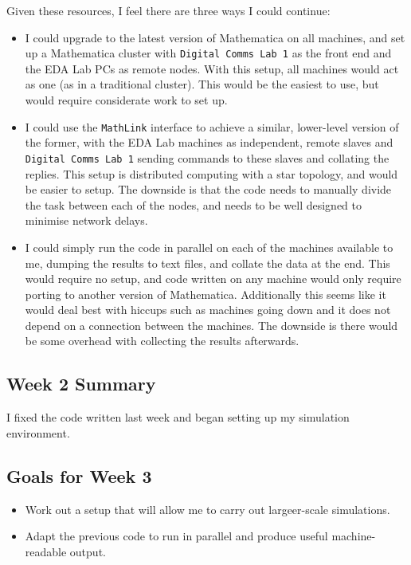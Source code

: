 Given these resources, I feel there are three ways I could continue:

\begin{itemize}
\itemsep1pt\parskip0pt
\item
  I could upgrade to the latest version of Mathematica on all machines,
  and set up a Mathematica cluster with \texttt{Digital Comms Lab 1} as
  the front end and the EDA Lab PCs as remote nodes. With this setup,
  all machines would act as one (as in a traditional cluster). This
  would be the easiest to use, but would require considerate work to set
  up.
\item
  I could use the \texttt{MathLink} interface to achieve a similar,
  lower-level version of the former, with the EDA Lab machines as
  independent, remote slaves and \texttt{Digital Comms Lab 1} sending
  commands to these slaves and collating the replies. This setup is
  distributed computing with a star topology, and would be easier to
  setup. The downside is that the code needs to manually divide the task
  between each of the nodes, and needs to be well designed to minimise
  network delays.
\item
  I could simply run the code in parallel on each of the machines
  available to me, dumping the results to text files, and collate the
  data at the end. This would require no setup, and code written on any
  machine would only require porting to another version of Mathematica.
  Additionally this seems like it would deal best with hiccups such as
  machines going down and it does not depend on a connection between the
  machines. The downside is there would be some overhead with collecting
  the results afterwards.
\end{itemize}

\subsection{Week 2 Summary}

I fixed the code written last week and began setting up my simulation
environment.

\subsection{Goals for Week 3}

\begin{itemize}
\itemsep1pt\parskip0pt
\item
  Work out a setup that will allow me to carry out largeer-scale
  simulations.
\item
  Adapt the previous code to run in parallel and produce useful
  machine-readable output.
\end{itemize}


